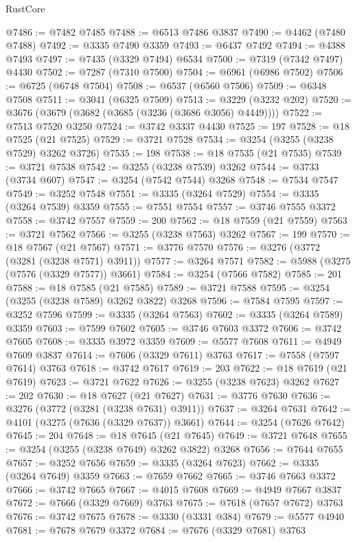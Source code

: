 \begin{lexlean}{RustCore}
\begin{coremodule}
@7486 := @7482 @7485
@7488 := @6513 @7486 @3837
@7490 := @4462 (@7480 @7488)
@7492 := @3335 @7490 @3359
@7493 := @6437 @7492
@7494 := @4388 @7493
@7497 := @7435 (@3329 @7494) @6534
@7500 := @7319 (@7342 @7497) @4430
@7502 := @7287 (@7310 @7500)
@7504 := @6961 (@6986 @7502)
@7506 := @6725 (@6748 @7504)
@7508 := @6537 (@6560 @7506)
@7509 := @6348 @7508
@7511 := @3041 (@6325 @7509)
@7513 := @3229 (@3232 @202)
@7520 := @3676 (@3679 (@3682 (@3685 (@3236 (@3686 @3056) @4449))))
@7522 := @7513 @7520 @3250
@7524 := @3742 @3337 @4430
@7525 := 197
@7528 := @18 @7525 (@21 @7525)
@7529 := @3721 @7528
@7534 := @3254 (@3255 (@3238 @7529) @3262 @3726)
@7535 := 198
@7538 := @18 @7535 (@21 @7535)
@7539 := @3721 @7538
@7542 := @3255 (@3238 @7539) @3262
@7544 := @3733 (@3734 @607)
@7547 := @3254 (@7542 @7544) @3268
@7548 := @7534 @7547
@7549 := @3252 @7548
@7551 := @3335 (@3264 @7529)
@7554 := @3335 (@3264 @7539) @3359
@7555 := @7551 @7554
@7557 := @3746 @7555 @3372
@7558 := @3742 @7557
@7559 := 200
@7562 := @18 @7559 (@21 @7559)
@7563 := @3721 @7562
@7566 := @3255 (@3238 @7563) @3262
@7567 := 199
@7570 := @18 @7567 (@21 @7567)
@7571 := @3776 @7570
@7576 := @3276 (@3772 (@3281 (@3238 @7571) @3911))
@7577 := @3264 @7571
@7582 := @5988 (@3275 (@7576 (@3329 @7577)) @3661)
@7584 := @3254 (@7566 @7582)
@7585 := 201
@7588 := @18 @7585 (@21 @7585)
@7589 := @3721 @7588
@7595 := @3254 (@3255 (@3238 @7589) @3262 @3822) @3268
@7596 := @7584 @7595
@7597 := @3252 @7596
@7599 := @3335 (@3264 @7563)
@7602 := @3335 (@3264 @7589) @3359
@7603 := @7599 @7602
@7605 := @3746 @7603 @3372
@7606 := @3742 @7605
@7608 := @3335 @3972 @3359
@7609 := @5577 @7608
@7611 := @4949 @7609 @3837
@7614 := @7606 (@3329 @7611) @3763
@7617 := @7558 (@7597 @7614) @3763
@7618 := @3742 @7617
@7619 := 203
@7622 := @18 @7619 (@21 @7619)
@7623 := @3721 @7622
@7626 := @3255 (@3238 @7623) @3262
@7627 := 202
@7630 := @18 @7627 (@21 @7627)
@7631 := @3776 @7630
@7636 := @3276 (@3772 (@3281 (@3238 @7631) @3911))
@7637 := @3264 @7631
@7642 := @4101 (@3275 (@7636 (@3329 @7637)) @3661)
@7644 := @3254 (@7626 @7642)
@7645 := 204
@7648 := @18 @7645 (@21 @7645)
@7649 := @3721 @7648
@7655 := @3254 (@3255 (@3238 @7649) @3262 @3822) @3268
@7656 := @7644 @7655
@7657 := @3252 @7656
@7659 := @3335 (@3264 @7623)
@7662 := @3335 (@3264 @7649) @3359
@7663 := @7659 @7662
@7665 := @3746 @7663 @3372
@7666 := @3742 @7665
@7667 := @4015 @7608
@7669 := @4949 @7667 @3837
@7672 := @7666 (@3329 @7669) @3763
@7675 := @7618 (@7657 @7672) @3763
@7676 := @3742 @7675
@7678 := @3330 (@3331 @384)
@7679 := @5577 @4940
@7681 := @7678 @7679 @3372
@7684 := @7676 (@3329 @7681) @3763

\end{coremodule}
\end{lexlean}

